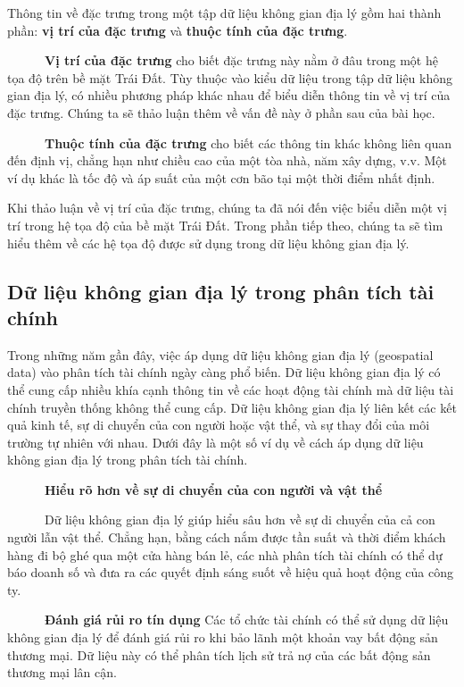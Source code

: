 Thông tin về đặc trưng trong một tập dữ liệu không gian địa lý gồm hai thành phần: \textbf{vị trí của đặc trưng} và \textbf{thuộc tính của đặc trưng}.

~~~~~~\textbf{Vị trí của đặc trưng} cho biết đặc trưng này nằm ở đâu trong một hệ tọa độ trên bề mặt Trái Đất. Tùy thuộc vào kiểu dữ liệu trong tập dữ liệu không gian địa lý, có nhiều phương pháp khác nhau để biểu diễn thông tin về vị trí của đặc trưng. Chúng ta sẽ thảo luận thêm về vấn đề này ở phần sau của bài học.

~~~~~~\textbf{Thuộc tính của đặc trưng} cho biết các thông tin khác không liên quan đến định vị, chẳng hạn như chiều cao của một tòa nhà, năm xây dựng, v.v. Một ví dụ khác là tốc độ và áp suất của một cơn bão tại một thời điểm nhất định.

Khi thảo luận về vị trí của đặc trưng, chúng ta đã nói đến việc biểu diễn một vị trí trong hệ tọa độ của bề mặt Trái Đất. Trong phần tiếp theo, chúng ta sẽ tìm hiểu thêm về các hệ tọa độ được sử dụng trong dữ liệu không gian địa lý.

\subsection{Dữ liệu không gian địa lý trong phân tích tài chính}

Trong những năm gần đây, việc áp dụng dữ liệu không gian địa lý (geospatial data) vào phân tích tài chính ngày càng phổ biến. Dữ liệu không gian địa lý có thể cung cấp nhiều khía cạnh thông tin về các hoạt động tài chính mà dữ liệu tài chính truyền thống không thể cung cấp. Dữ liệu không gian địa lý liên kết các kết quả kinh tế, sự di chuyển của con người hoặc vật thể, và sự thay đổi của môi trường tự nhiên với nhau. Dưới đây là một số ví dụ về cách áp dụng dữ liệu không gian địa lý trong phân tích tài chính.

~~~~~~\textbf{Hiểu rõ hơn về sự di chuyển của con người và vật thể}

~~~~~~Dữ liệu không gian địa lý giúp hiểu sâu hơn về sự di chuyển của cả con người lẫn vật thể. Chẳng hạn, bằng cách nắm được tần suất và thời điểm khách hàng đi bộ ghé qua một cửa hàng bán lẻ, các nhà phân tích tài chính có thể dự báo doanh số và đưa ra các quyết định sáng suốt về hiệu quả hoạt động của công ty.

~~~~~~\textbf{Đánh giá rủi ro tín dụng} Các tổ chức tài chính có thể sử dụng dữ liệu không gian địa lý để đánh giá rủi ro khi bảo lãnh một khoản vay bất động sản thương mại. Dữ liệu này có thể phân tích lịch sử trả nợ của các bất động sản thương mại lân cận.

